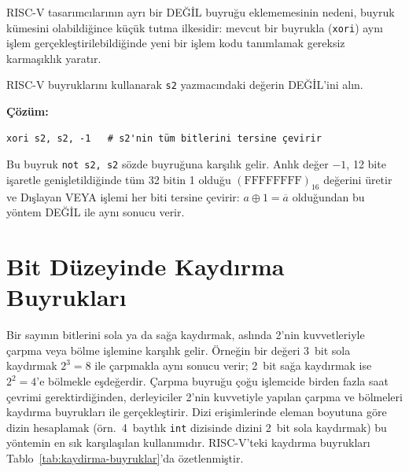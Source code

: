 RISC-V tasarımcılarının ayrı bir DEĞİL buyruğu eklememesinin nedeni, buyruk kümesini olabildiğince küçük tutma ilkesidir: mevcut bir buyrukla (\texttt{xori}) aynı işlem gerçekleştirilebildiğinde yeni bir işlem kodu tanımlamak gereksiz karmaşıklık yaratır.

\begin{ornek}[3.13]
RISC-V buyruklarını kullanarak \texttt{s2} yazmacındaki değerin DEĞİL'ini alın.

\textbf{Çözüm:}
\begin{lstlisting}[style=riscv]
xori s2, s2, -1   # s2'nin tüm bitlerini tersine çevirir
\end{lstlisting}

Bu buyruk \texttt{not s2, s2} sözde buyruğuna karşılık gelir. Anlık değer $-1$, 12 bite işaretle genişletildiğinde tüm 32 bitin 1 olduğu $(\text{FFFFFFFF})_{16}$ değerini üretir ve Dışlayan VEYA işlemi her biti tersine çevirir: $a \oplus 1 = \overline{a}$ olduğundan bu yöntem DEĞİL ile aynı sonucu verir.
\end{ornek}


\section{Bit Düzeyinde Kaydırma Buyrukları}
\label{sec:kaydirma-buyruklar}

Bir sayının bitlerini sola ya da sağa kaydırmak, aslında 2'nin kuvvetleriyle çarpma veya bölme işlemine karşılık gelir. Örneğin bir değeri 3~bit sola kaydırmak $2^3 = 8$ ile çarpmakla aynı sonucu verir; 2~bit sağa kaydırmak ise $2^2 = 4$'e bölmekle eşdeğerdir. Çarpma buyruğu çoğu işlemcide birden fazla saat çevrimi gerektirdiğinden, derleyiciler 2'nin kuvvetiyle yapılan çarpma ve bölmeleri kaydırma buyrukları ile gerçekleştirir. Dizi erişimlerinde eleman boyutuna göre dizin hesaplamak (örn.\ 4~baytlık \texttt{int} dizisinde dizini 2~bit sola kaydırmak) bu yöntemin en sık karşılaşılan kullanımıdır. RISC-V'teki kaydırma buyrukları Tablo~\ref{tab:kaydirma-buyruklar}'da özetlenmiştir.

